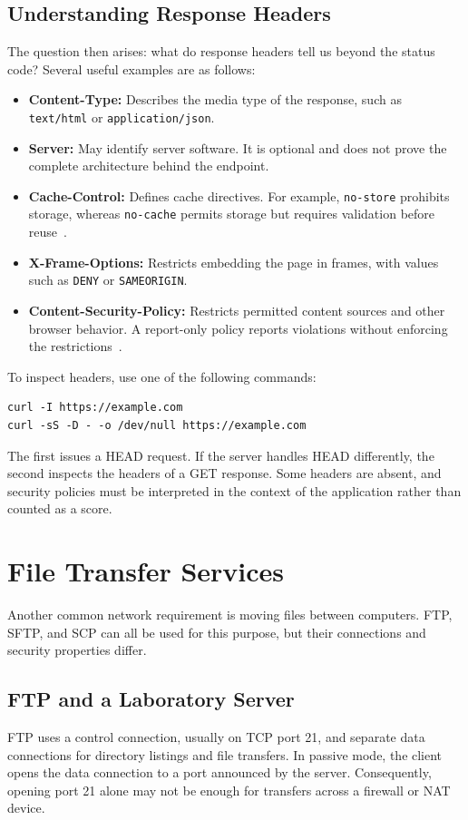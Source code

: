 \documentclass[journal]{IEEEtran}
\begin{document}
\subsection{Understanding Response Headers}
The question then arises: what do response headers tell us beyond the status code? Several useful examples are as follows:
\begin{itemize}
    \item \textbf{Content-Type:} Describes the media type of the response, such as \texttt{text/html} or \texttt{application/json}.
    \item \textbf{Server:} May identify server software. It is optional and does not prove the complete architecture behind the endpoint.
    \item \textbf{Cache-Control:} Defines cache directives. For example, \texttt{no-store} prohibits storage, whereas \texttt{no-cache} permits storage but requires validation before reuse~\cite{httpcache}.
    \item \textbf{X-Frame-Options:} Restricts embedding the page in frames, with values such as \texttt{DENY} or \texttt{SAMEORIGIN}.
    \item \textbf{Content-Security-Policy:} Restricts permitted content sources and other browser behavior. A report-only policy reports violations without enforcing the restrictions~\cite{csp}.
\end{itemize}
To inspect headers, use one of the following commands:
\begin{lstlisting}
curl -I https://example.com
curl -sS -D - -o /dev/null https://example.com
\end{lstlisting}
The first issues a HEAD request. If the server handles HEAD differently, the second inspects the headers of a GET response. Some headers are absent, and security policies must be interpreted in the context of the application rather than counted as a score.

\section{File Transfer Services}
Another common network requirement is moving files between computers. FTP, SFTP, and SCP can all be used for this purpose, but their connections and security properties differ.

\subsection{FTP and a Laboratory Server}
FTP uses a control connection, usually on TCP port 21, and separate data connections for directory listings and file transfers. In passive mode, the client opens the data connection to a port announced by the server. Consequently, opening port 21 alone may not be enough for transfers across a firewall or NAT device.
\end{document}
